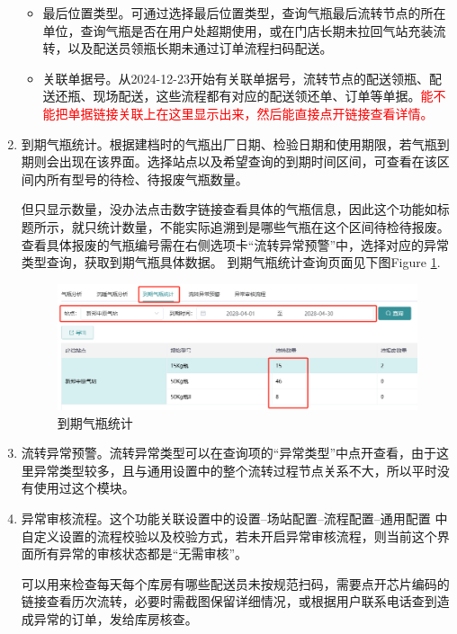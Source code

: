 \documentclass[UTF8]{ctexart}
\begin{document}
\begin{enumerate}
\begin{itemize}
		\item 最后位置类型。可通过选择最后位置类型，查询气瓶最后流转节点的所在单位，查询气瓶是否在用户处超期使用，或在门店长期未拉回气站充装流转，以及配送员领瓶长期未通过订单流程扫码配送。
		
		\item 关联单据号。从2024-12-23开始有关联单据号，流转节点的配送领瓶、配送还瓶、现场配送，这些流程都有对应的配送领还单、订单等单据。\textcolor{red}{能不能把单据链接关联上在这里显示出来，然后能直接点开链接查看详情。}
		
	\end{itemize}
	
	\item 到期气瓶统计。根据建档时的气瓶出厂日期、检验日期和使用期限，若气瓶到期则会出现在该界面。选择站点以及希望查询的到期时间区间，可查看在该区间内所有型号的待检、待报废气瓶数量。
	
	但只显示数量，没办法点击数字链接查看具体的气瓶信息，因此这个功能如标题所示，就只统计数量，不能实际追溯到是哪些气瓶在这个区间待检待报废。查看具体报废的气瓶编号需在右侧选项卡“流转异常预警”中，选择对应的异常类型查询，获取到期气瓶具体数据。
	到期气瓶统计查询页面见下图Figure \ref{fig:overdue}.
	\begin{figure}[h]
		\centering
		\includegraphics[width=1\textwidth]{dlh_tutorial_figs/overdue}
		\caption{到期气瓶统计}
		\label{fig:overdue}
	\end{figure}
	
	\item 流转异常预警。流转异常类型可以在查询项的“异常类型”中点开查看，由于这里异常类型较多，且与通用设置中的整个流转过程节点关系不大，所以平时没有使用过这个模块。
	
	\item 异常审核流程。这个功能关联设置中的设置--场站配置--流程配置--通用配置 中自定义设置的流程校验以及校验方式，若未开启异常审核流程，则当前这个界面所有异常的审核状态都是“无需审核”。
	
	可以用来检查每天每个库房有哪些配送员未按规范扫码，需要点开芯片编码的链接查看历次流转，必要时需截图保留详细情况，或根据用户联系电话查到造成异常的订单，发给库房核查。
	
	
\end{enumerate}
\end{document}

